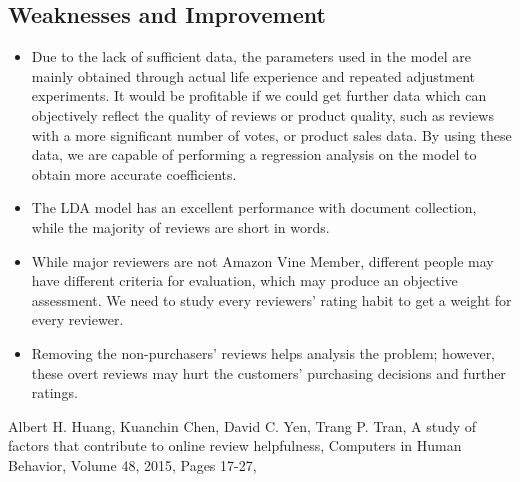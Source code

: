\documentclass{mcmthesis}
\begin{document}
\subsection{Weaknesses and Improvement}
\begin{itemize}
  \item Due to the lack of sufficient data, the parameters used in the model are mainly obtained through actual life experience and repeated adjustment experiments. It would be profitable if we could get further data which can objectively reflect the quality of reviews or product quality, such as reviews with a more significant number of votes, or product sales data. By using these data, we are capable of performing a regression analysis on the model to obtain more accurate coefficients.
  \item The LDA model has an excellent performance with document collection, while the majority of reviews are short in words. 
  \item While major reviewers are not Amazon Vine Member, different people may have different criteria for evaluation, which may produce an objective assessment. We need to study every reviewers' rating habit to get a weight for every reviewer.
  \item Removing the non-purchasers' reviews helps analysis the problem; however, these overt reviews may hurt the customers' purchasing decisions and further ratings.
\end{itemize}

\begin{thebibliography}{99}
   Albert H. Huang, Kuanchin Chen, David C. Yen, Trang P. Tran,
  A study of factors that contribute to online review helpfulness,
  Computers in Human Behavior, Volume 48, 2015, Pages 17-27,
\end{thebibliography}
\end{document}
